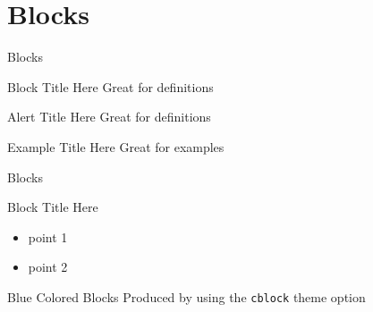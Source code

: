 \documentclass[newPxFont,numfooter,sectionpages]{beamer}
\begin{document}
\begingroup
{}
\begin{frame}[plain]


\end{frame}
\endgroup

\begingroup
{}
\begin{frame}[plain]


\end{frame}
\endgroup


\section{Blocks}\label{Blocks}



\begin{frame}{Blocks}

\begin{block}{Block Title Here}
		Great for definitions
\end{block}

\begin{alertblock}{Alert Title Here}
		Great for definitions
\end{alertblock}

\begin{exampleblock}{Example Title Here}
		Great for examples
\end{exampleblock}
\end{frame}


\begin{frame}{Blocks}

\begin{block}{Block Title Here}
	\begin{itemize}
		\item point 1
		\item point 2
	\end{itemize}
\end{block}

\begingroup
{}
\begin{block}{Blue Colored Blocks}
	Produced by using the \texttt{cblock} theme option
\end{block}
\endgroup
\end{frame}
\end{document}
